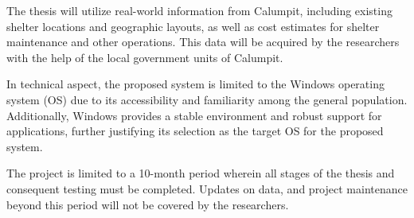 	The thesis will utilize real-world information from Calumpit, including existing shelter locations and geographic layouts, as well as cost estimates for shelter maintenance and other operations. This data will be acquired by the researchers with the help of the local government units of Calumpit.
	
	In technical aspect, the proposed system is limited to the Windows operating system (OS) due to its accessibility and familiarity among the general population. Additionally, Windows provides a stable environment and robust support for applications, further justifying its selection as the target OS for the proposed system.
	
	The project is limited to a 10-month period wherein all stages of the thesis and consequent testing must be completed. Updates on data, and project maintenance beyond this period will not be covered by the researchers.
